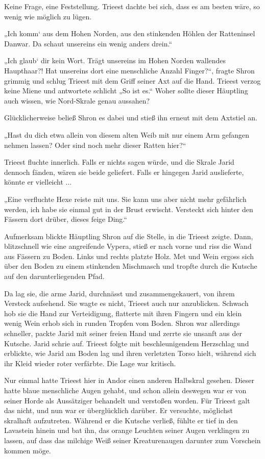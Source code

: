Keine Frage, eine Feststellung. Trieest dachte bei sich, dass es am besten wäre, so wenig wie möglich zu lügen.

„Ich komm‘ aus dem Hohen Norden, aus den stinkenden Höhlen der Ratteninsel Danwar. Da schaut unsereins ein wenig anders drein.“

„Ich glaub‘ dir kein Wort. Trägt unsereins im Hohen Norden wallendes Haupthaar?! Hat unsereins dort eine menschliche Anzahl Finger?“, fragte Shron grimmig und schlug Trieest mit dem Griff seiner Axt auf die Hand. Trieest verzog keine Miene und antwortete schlicht „So ist es.“ Woher sollte dieser Häuptling auch wissen, wie Nord-Skrale genau aussahen?

Glücklicherweise beließ Shron es dabei und stieß ihn erneut mit dem Axtstiel an.

„Hast du dich etwa allein von diesem alten Weib mit nur einem Arm gefangen nehmen lassen? Oder sind noch mehr dieser Ratten hier?“

Trieest fluchte innerlich. Falls er nichts sagen würde, und die Skrale Jarid dennoch fänden, wären sie beide geliefert. Falls er hingegen Jarid auslieferte, könnte er vielleicht ...

„Eine verfluchte Hexe reiste mit uns. Sie kann uns aber nicht mehr gefährlich werden, ich habe sie einmal gut in der Brust erwischt. Versteckt sich hinter den Fässern dort drüber, dieses feige Ding.“

Aufmerksam blickte Häuptling Shron auf die Stelle, in die Trieest zeigte. Dann, blitzschnell wie eine angreifende Vypera, stieß er nach vorne und riss die Wand aus Fässern zu Boden. Links und rechts platzte Holz. Met und Wein ergoss sich über den Boden zu einem stinkenden Mischmasch und tropfte durch die Kutsche auf den darunterliegenden Pfad.

Da lag sie, die arme Jarid, durchnässt und zusammengekauert, von ihrem Versteck aufsehend. Sie wagte es nicht, Trieest auch nur anzublicken. Schwach hob sie die Hand zur Verteidigung, flatterte mit ihren Fingern und ein klein wenig Wein erhob sich in runden Tropfen vom Boden. Shron war allerdings schneller, packte Jarid mit seiner freien Hand und zerrte sie unsanft aus der Kutsche. Jarid schrie auf. Trieest folgte mit beschleunigendem Herzschlag und erblickte, wie Jarid am Boden lag und ihren verletzten Torso hielt, während sich ihr Kleid wieder roter verfärbte. Die Lage war kritisch.

Nur einmal hatte Trieest hier in Andor einen anderen Halbskral gesehen. Dieser hatte blaue menschliche Augen gehabt, und schon allein deswegen war er von seiner Horde als Aussätziger behandelt und verstoßen worden. Für Trieest galt das nicht, und nun war er überglücklich darüber. Er versuchte, möglichst skralhaft aufzutreten. Während er die Kutsche verließ, fühlte er tief in den Lavastein hinein und bat ihn, das orange Leuchten seiner Augen verklingen zu lassen, auf dass das milchige Weiß seiner Kreaturenaugen darunter zum Vorschein kommen möge.

